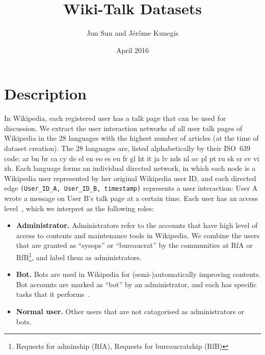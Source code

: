 \documentclass[a4paper]{article}
\begin{document}
\title{Wiki-Talk Datasets}
\author{
    Jun Sun and J\'er\^ome Kunegis
}
\date{April 2016}
\maketitle
{}

\section{Description}

In Wikipedia, each registered user has a talk page that can be used for discussion. We extract the user interaction networks of all user talk pages of Wikipedia in the 28 languages with the highest number of articles (at the time of dataset creation). 
The 28 languages are, listed alphabetically by their ISO~639 code: ar bn br ca cy de el en eo es eu fr gl ht it ja lv nds nl oc pl pt ru sk sr sv vi zh.
Each language forms an individual directed network, in which each node is a Wikipedia user represented by her original Wikipedia user ID,
and each directed edge \texttt{(User\_ID\_A, User\_ID\_B, timestamp)} 
represents a user interaction: User A wrote a message on User B's talk page at a certain time.
Each user has an access level~\cite{wiki:accesslevel}, which we interpret as the following roles:
\begin{itemize} 
\item \textbf{Administrator.}
  Administrators refer to the accounts that have high level of access to contents and maintenance tools in Wikipedia. We combine the users that are granted as ``sysops'' or ``bureaucrat'' by the communities at RfA or RfB\footnote{Requests for adminship (RfA), Requests for bureaucratship (RfB)}, and label them as administrators.
\item \textbf{Bot.}
    Bots are used in Wikipedia for (semi-)automatically improving contents. Bot accounts are marked as ``bot'' by an administrator, and each has specific tasks that it  performs~\cite{wiki:botpolicy}.
\item \textbf{Normal user.}
  Other users that are not catagorised as administrators or bots.
\end{itemize}
\end{document}
